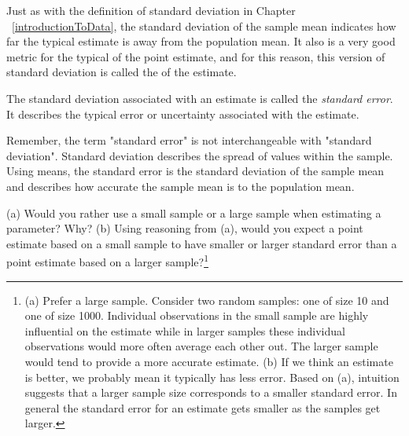 Just as with the definition of standard deviation in Chapter ~\ref{introductionToData}, the standard deviation of the sample mean indicates how far the typical estimate is away from the population mean. It also is a very good metric for the typical  of the point estimate, and for this reason, this version of standard deviation is called the   of the estimate. 

\begin{termBox}{
The standard deviation associated with an estimate is called the \emph{standard error}. It describes the typical error or uncertainty associated with the estimate.}
\end{termBox}

\begin{tipBox}{
Remember, the term "standard error" is not interchangeable with "standard deviation". Standard deviation describes the spread of values within the sample. Using means, the standard error is the standard deviation of the sample mean and describes how accurate the sample mean is to the population mean.}
\end{tipBox}

\begin{exercise}
(a) Would you rather use a small sample or a large sample when estimating a parameter? Why? (b) Using reasoning from (a), would you expect a point estimate based on a small sample to have smaller or larger standard error than a point estimate based on a larger sample?\footnote{(a) Prefer a large sample. Consider two random samples: one of size 10 and one of size 1000. Individual observations in the small sample are highly influential on the estimate while in larger samples these individual observations would more often average each other out. The larger sample would tend to provide a more accurate estimate. (b) If we think an estimate is better, we probably mean it typically has less error. Based on (a), intuition suggests that a larger sample size corresponds to a smaller standard error. In general the standard error for an estimate gets smaller as the samples get larger.}
\end{exercise}

